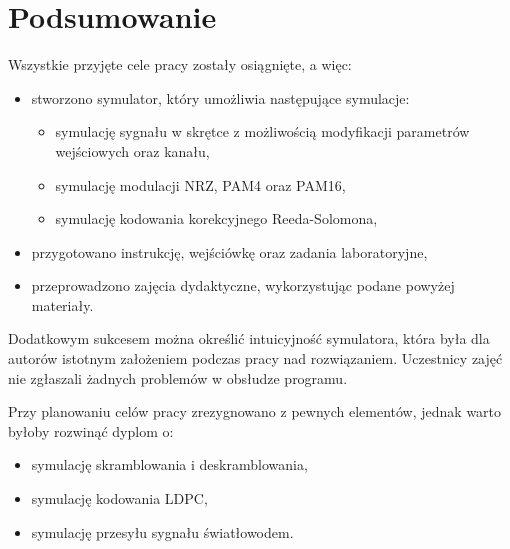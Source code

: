 \section{Podsumowanie}

Wszystkie przyjęte cele pracy zostały osiągnięte, a więc:
\begin{itemize}
    \item stworzono symulator, który umożliwia następujące symulacje:
    \begin{itemize}
        \item symulację sygnału w skrętce z możliwością modyfikacji parametrów wejściowych oraz kanału,
        \item symulację modulacji NRZ, PAM4 oraz PAM16,
        \item symulację kodowania korekcyjnego Reeda-Solomona,
    \end{itemize}
    \item przygotowano instrukcję, wejściówkę oraz zadania laboratoryjne,
    \item przeprowadzono zajęcia dydaktyczne, wykorzystując podane powyżej materiały.
\end{itemize}

Dodatkowym sukcesem można określić intuicyjność symulatora, która była dla autorów istotnym założeniem podczas pracy nad rozwiązaniem. Uczestnicy zajęć nie zgłaszali żadnych problemów w obsłudze programu.

Przy planowaniu celów pracy zrezygnowano z pewnych elementów, jednak warto byłoby rozwinąć dyplom o:
\begin{itemize}
    \item symulację skramblowania i deskramblowania,
    \item symulację kodowania LDPC,
    \item symulację przesyłu sygnału światłowodem.
\end{itemize}